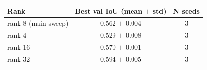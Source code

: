 \begin{tabular}{lcc}
\toprule
Rank & Best val IoU (mean $\pm$ std) & N seeds \\
\midrule
rank 8 (main sweep) & 0.562 $\pm$ 0.004 & 3 \\
rank 4 & 0.529 $\pm$ 0.008 & 3 \\
rank 16 & 0.570 $\pm$ 0.001 & 3 \\
rank 32 & 0.594 $\pm$ 0.005 & 3 \\
\bottomrule
\end{tabular}
